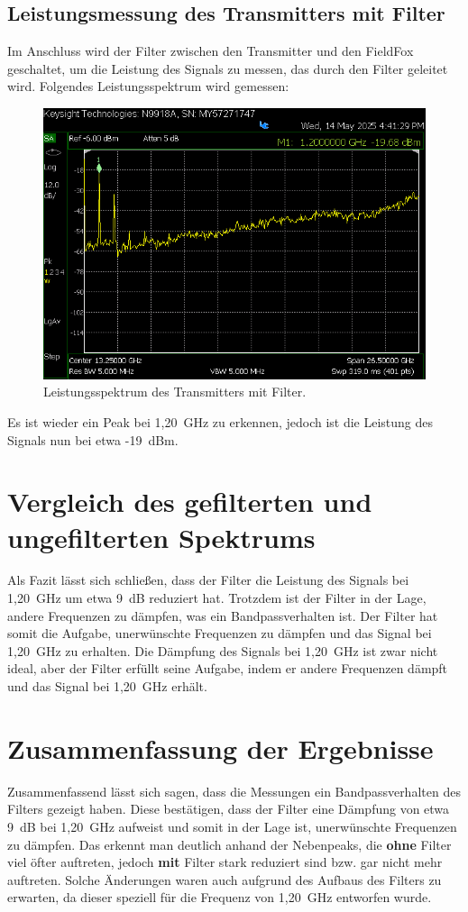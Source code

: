     \subsection{Leistungsmessung des Transmitters mit Filter}
    Im Anschluss wird der Filter zwischen den Transmitter und den FieldFox geschaltet, um die Leistung des Signals zu messen, das durch den Filter geleitet wird.
    Folgendes Leistungsspektrum wird gemessen:
    \begin{figure}[H]
        \centering
        \includegraphics[width=0.6\linewidth]{Pictures/SA-TranceiverMitFIlterPeakCooleGruppe.png}
        \caption{Leistungsspektrum des Transmitters mit Filter.}
        \label{fig:transmitter_spectrum_with_filter}
    \end{figure}
    Es ist wieder ein Peak bei 1,20~GHz zu erkennen, jedoch ist die Leistung des Signals nun bei etwa -19~dBm. 
\section{Vergleich des gefilterten und ungefilterten Spektrums}
Als Fazit lässt sich schließen, dass der Filter die Leistung des Signals bei 1,20~GHz um etwa 9~dB reduziert hat. Trotzdem ist der Filter in der Lage, andere Frequenzen zu dämpfen, was ein Bandpassverhalten ist. 
Der Filter hat somit die Aufgabe, unerwünschte Frequenzen zu dämpfen und das Signal bei 1,20~GHz zu erhalten. 
Die Dämpfung des Signals bei 1,20~GHz ist zwar nicht ideal, aber der Filter erfüllt seine Aufgabe, indem er andere Frequenzen dämpft und das Signal bei 1,20~GHz erhält.

\section{Zusammenfassung der Ergebnisse}
Zusammenfassend lässt sich sagen, dass die Messungen ein Bandpassverhalten des Filters gezeigt haben.
Diese bestätigen, dass der Filter eine Dämpfung von etwa 9~dB bei 1,20~GHz aufweist und somit in der Lage ist, unerwünschte Frequenzen zu dämpfen. Das erkennt man deutlich anhand der Nebenpeaks, die \textbf{ohne} Filter viel öfter auftreten, jedoch \textbf{mit} Filter stark reduziert sind bzw. gar nicht mehr auftreten.
Solche Änderungen waren auch aufgrund des Aufbaus des Filters zu erwarten, da dieser speziell für die Frequenz von 1,20~GHz entworfen wurde.